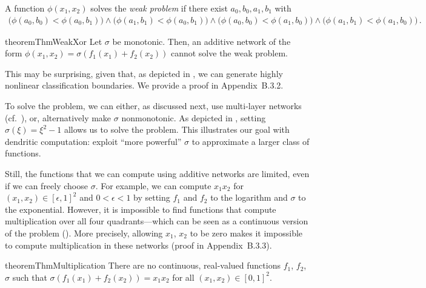 \begin{definition}
\label{def:weak_xor}
A function $\phi(x_1, x_2)$ solves the \emph{weak \XOR problem} if there exist $a_0, b_0, a_1, b_1$ with
\begin{align*}
	\big( \phi(a_0, b_0) < \phi(a_0, b_1) \big) \wedge
	\big( \phi(a_1, b_1) < \phi(a_0, b_1) \big) \wedge
	\big( \phi(a_0, b_0) < \phi(a_1, b_0) \big) \wedge
	\big( \phi(a_1, b_1) < \phi(a_1, b_0) \big) \,.
\end{align*}
\end{definition}


\begin{restatable}{theorem}{ThmWeakXor}
\label{thm:weak_xor}
Let $\sigma$ be monotonic. Then, an additive network of the form $\phi(x_1, x_2) = \sigma(f_1(x_1) + f_2(x_2))$ cannot solve the weak \XOR problem.
\end{restatable}
This may be surprising, given that, as depicted in , we can generate highly nonlinear classification boundaries.
We provide a proof in Appendix~B.3.2.

To solve the \XOR problem, we can either, as discussed next, use multi-layer networks (cf.~), or, alternatively make $\sigma$ nonmonotonic.
As depicted in , setting $\sigma(\xi) = \xi^2 - 1$ allows us to solve the \XOR problem.
This illustrates our goal with dendritic computation: exploit \enquote{more powerful} $\sigma$ to approximate a larger class of functions.

Still, the functions that we can compute using additive networks are limited, even if we can freely choose $\sigma$.
For example, we can compute $x_1 x_2$ for $(x_1, x_2) \in [\epsilon, 1]^2$ and $0 < \epsilon < 1$ by setting $f_1$ and $f_2$ to the logarithm and $\sigma$ to the exponential.
However, it is impossible to find functions that compute multiplication over all four quadrants---which can be seen as a continuous version of the \XOR problem ().
More precisely, allowing $x_1$, $x_2$ to be zero makes it impossible to compute multiplication in these networks (proof in Appendix~B.3.3).
\begin{restatable}{theorem}{ThmMultiplication}
\label{thm:multiplication}
There are no continuous, real-valued functions $f_1$, $f_2$, $\sigma$ such that $\sigma(f_1(x_1) + f_2(x_2)) = x_1 x_2$ for all $(x_1, x_2) \in [0, 1]^2$.
\end{restatable}

